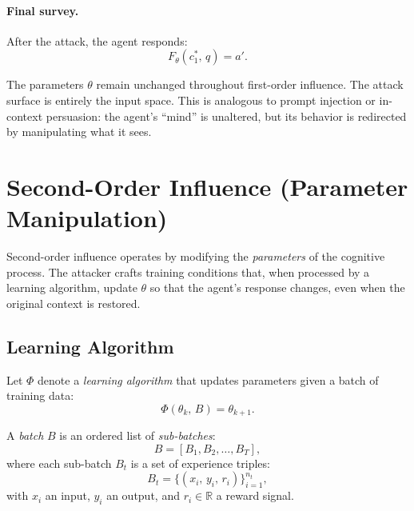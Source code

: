 \paragraph{Final survey.} After the attack, the agent responds:
\begin{equation}
    F_\theta(c_1^*,\, q) = a'.
\end{equation}
 
The parameters $\theta$ remain unchanged throughout first-order influence. The attack surface is entirely the input space. This is analogous to prompt injection or in-context persuasion: the agent's ``mind'' is unaltered, but its behavior is redirected by manipulating what it sees.
 
\section{Second-Order Influence (Parameter Manipulation)}
 
Second-order influence operates by modifying the \emph{parameters} of the cognitive process. The attacker crafts training conditions that, when processed by a learning algorithm, update $\theta$ so that the agent's response changes, even when the original context is restored.
 
\subsection{Learning Algorithm}
 
\begin{definition}
Let $\Phi$ denote a \emph{learning algorithm} that updates parameters given a batch of training data:
\begin{equation}
    \Phi(\theta_k,\, B) = \theta_{k+1}.
\end{equation}
\end{definition}
 
\begin{definition}[Batch]
A \emph{batch} $B$ is an ordered list of \emph{sub-batches}:
\begin{equation}
    B = [B_1, B_2, \ldots, B_T],
\end{equation}
where each sub-batch $B_t$ is a set of experience triples:
\begin{equation}
    B_t = \bigl\{(x_i,\, y_i,\, r_i)\bigr\}_{i=1}^{n_t},
\end{equation}
with $x_i$ an input, $y_i$ an output, and $r_i \in \mathbb{R}$ a reward signal.
\end{definition}
 
